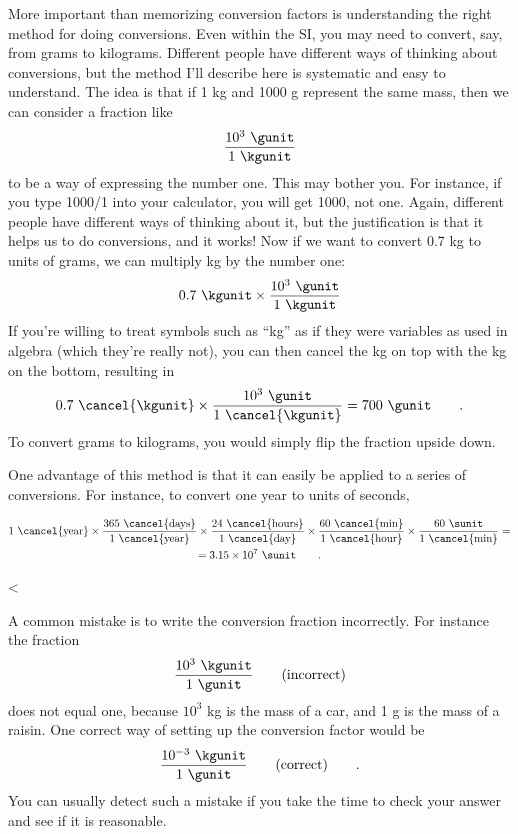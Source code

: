 More important than memorizing conversion factors is
understanding the right method for doing conversions. Even
within the SI, you may need to convert, say, from grams to
kilograms. Different people have different ways of thinking
about conversions, but the method I'll describe here is
systematic and easy to understand. The idea is that if 1 kg
and 1000 g represent the same mass, then we can consider a fraction like
\begin{equation*}
  \frac{10^3\ \gunit}{1\ \kgunit}
\end{equation*}
to be a way of expressing the number one. This may bother
you. For instance, if you type 1000/1 into your calculator,
you will get 1000, not one. Again, different people have
different ways of thinking about it, but the justification
is that it helps us to do conversions, and it works! Now if
we want to convert 0.7 kg to units of grams, we can multiply
kg by the number one:
\begin{equation*}
  0.7\ \kgunit \times \frac{10^3\ \gunit}{1\ \kgunit}
\end{equation*}
If you're willing to treat symbols such as ``kg'' as if they
were variables as used in algebra (which they're really
not), you can then cancel the kg on top with the kg on the
bottom, resulting in
\begin{equation*}
  0.7\ \cancel{\kgunit} \times \frac{10^3\ \gunit}{1\ \cancel{\kgunit}}  = 700\ \gunit   \qquad   .
\end{equation*}
To convert grams to kilograms, you would simply flip the
fraction upside down.

One advantage of this method is that it can easily be
applied to a series of conversions. For instance, to convert
one year to units of seconds,

\begin{multline*}
1\ \cancel{\text{year}} \times
\frac{365\ \cancel{\text{days}}}{1\ \cancel{\text{year}}} \times
\frac{24\ \cancel{\text{hours}}}{1\ \cancel{\text{day}}} \times
\frac{60\ \cancel{\text{min}}}{1\ \cancel{\text{hour}}} \times
\frac{60\ \sunit}{1\ \cancel{\text{min}}} = \\
= 3.15 \times 10^7\ \sunit   \qquad   .
\end{multline*}

<%

A common mistake is to write the conversion fraction
incorrectly. For instance the fraction
\begin{equation*}
  \frac{10^3\ \kgunit}{1\ \gunit} \qquad \text{(incorrect)}
\end{equation*}
does not equal one, because $10^3$  kg is the mass of a car,
and 1 g is the mass of a raisin. One correct way of
setting up the conversion factor would be
\begin{equation*}
  \frac{10^{-3}\ \kgunit}{1\ \gunit} \qquad \text{(correct)} \qquad .
\end{equation*}
You can usually detect such a mistake if you take the time
to check your answer and see if it is reasonable.

